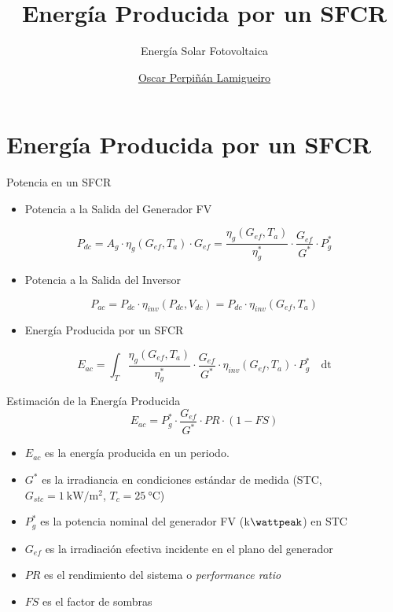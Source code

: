 \documentclass[aspectratio=169, usenames,svgnames,dvipsnames]{beamer}
\author{\href{https://oscarperpinan.github.io}{Oscar Perpiñán Lamigueiro}}
\date{}
\title{Energía Producida por un SFCR}
\subtitle{Energía Solar Fotovoltaica}
\institute[UPM]{Universidad Politécnica de Madrid}
\begin{document}
\maketitle

\section{Energía Producida por un SFCR}
\label{sec:org2891c78}
\begin{frame}[label={sec:org398ff81}]{Potencia en un SFCR}
\begin{itemize}
\item \alert{Potencia} a la Salida del Generador FV
\end{itemize}

$$P_{dc} = A_g \cdot \eta_g(G_{ef}, T_a) \cdot  G_{ef} = %
      \frac{\eta_g(G_{ef}, T_a)}{\eta_g^*} \cdot \frac{G_{ef}}{G^*} \cdot P_g^*$$

\begin{itemize}
\item \alert{Potencia} a la Salida del Inversor
\end{itemize}

$$P_{ac} = P_{dc} \cdot \eta_{inv}(P_{dc}, V_{dc}) =  P_{dc} \cdot \eta_{inv}(G_{ef}, T_a)$$

\begin{itemize}
\item \alert{Energía} Producida por un SFCR
\end{itemize}

$$E_{ac} = \int_T \frac{\eta_g(G_{ef}, T_a)}{\eta_g^*} \cdot
      \frac{G_{ef}}{G^*} \cdot \eta_{inv}(G_{ef}, T_a) \cdot P_g^*\quad \mathrm{dt}$$
\end{frame}

\begin{frame}[label={sec:org1d64535}]{Estimación de la Energía Producida}
$$E_{ac}=P_{g}^{*}\cdot\frac{G_{ef}}{G^*}\cdot PR\cdot (1-FS)$$

\begin{itemize}
\item \(E_{ac}\) es la \alert{energía producida} en un periodo.

\item \(G^*\) es la \alert{irradiancia} en condiciones estándar de medida (STC,
\(G_{stc}=\SI{1}{\kilo\watt\per\meter\squared}\),
\(T_c=\SI{25}{\celsius}\))

\item \(P_{g}^{*}\) es la \alert{potencia nominal} del generador FV
(\(\si{\kilo\wattpeak}\)) en STC

\item \(G_{ef}\) es la \alert{irradiación efectiva incidente} en el plano del
generador

\item \(PR\) es el \alert{rendimiento del sistema} o \emph{performance ratio}

\item \(FS\) es el \alert{factor de sombras}
\end{itemize}
\end{frame}
\end{document}
